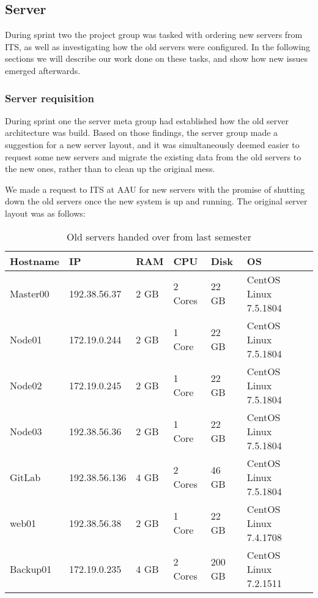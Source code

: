 \subsection{Server}\label{SEC:S2ServerWork}
During sprint two the project group was tasked with ordering new servers from ITS, as well as investigating how the old servers were configured.
In the following sections we will describe our work done on these tasks, and show how new issues emerged afterwards.

\subsubsection{Server requisition}
During sprint one the server meta group had established how the old server architecture was build.
Based on those findings, the server group made a suggestion for a new server layout, and it was simultaneously deemed easier to request some new servers and migrate the existing data from the old servers to the new ones, rather than to clean up the original mess.

We made a request to ITS at AAU for new servers with the promise of shutting down the old servers once the new system is up and running. 
The original server layout was as follows:

\begin{table}[H]

\begin{tabular}{|l|l|l|l|l|l|}
\hline
Hostname 	& IP 			& RAM 	& CPU 		& Disk 		& OS 						\\ \hline
Master00 	& 192.38.56.37 	& 2 GB 	& 2 Cores 	& 22 GB 	& CentOS Linux 7.5.1804 	\\ \hline
Node01 		& 172.19.0.244 	& 2 GB 	& 1 Core 	& 22 GB 	& CentOS Linux 7.5.1804 	\\ \hline
Node02		& 172.19.0.245	& 2 GB	& 1 Core	& 22 GB		& CentOS Linux 7.5.1804		\\ \hline
Node03		& 192.38.56.36	& 2 GB	& 1 Core 	& 22 GB		& CentOS Linux 7.5.1804 	\\ \hline
GitLab 		& 192.38.56.136	& 4 GB	& 2 Cores 	& 46 GB 	& CentOS Linux 7.5.1804 	\\ \hline
web01		& 192.38.56.38	& 2 GB	& 1 Core	& 22 GB 	& CentOS Linux 7.4.1708 	\\ \hline
Backup01	& 172.19.0.235	& 4 GB	& 2 Cores	& 200 GB 	& CentOS Linux 7.2.1511 	\\ \hline
\end{tabular}
\caption{Old servers handed over from last semester}
\end{table}

